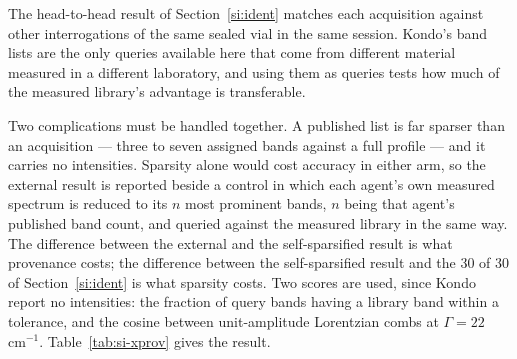 \documentclass[11pt]{article}
\newcommand*\wn{\ensuremath{\text{cm}^{-1}}}
\begin{document}
The head-to-head result of Section~\ref{si:ident} matches each acquisition against other
interrogations of the same sealed vial in the same session. Kondo's band lists are the only
queries available here that come from different material measured in a different
laboratory, and using them as queries tests how much of the measured library's advantage is
transferable.

Two complications must be handled together. A published list is far sparser than an
acquisition --- three to seven assigned bands against a full profile --- and it carries no
intensities. Sparsity alone would cost accuracy in either arm, so the external result is
reported beside a control in which each agent's own measured spectrum is reduced to its
$n$ most prominent bands, $n$ being that agent's published band count, and queried against
the measured library in the same way. The difference between the external and the
self-sparsified result is what provenance costs; the difference between the self-sparsified
result and the 30 of 30 of Section~\ref{si:ident} is what sparsity costs. Two scores are
used, since Kondo report no intensities: the fraction of query bands having a library band
within a tolerance, and the cosine between unit-amplitude Lorentzian combs at
$\Gamma = 22$\,\wn{}. Table~\ref{tab:si-xprov} gives the result.
\end{document}
